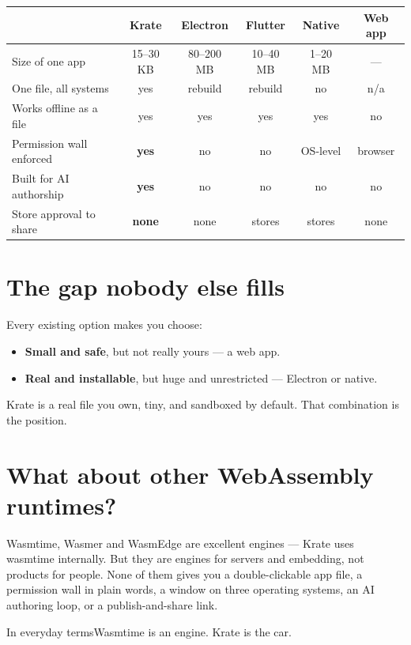 \documentclass[11pt,a4paper]{report}
\newcommand{\analogy}[1]{\begin{plainbox}{In everyday terms}#1\end{plainbox}}
\begin{document}
\begin{center}
\begin{tabular}{lccccc}
\toprule
& \textbf{Krate} & \textbf{Electron} & \textbf{Flutter} & \textbf{Native} & \textbf{Web app} \\
\midrule
Size of one app & 15--30 KB & 80--200 MB & 10--40 MB & 1--20 MB & --- \\
One file, all systems & yes & rebuild & rebuild & no & n/a \\
Works offline as a file & yes & yes & yes & yes & no \\
Permission wall enforced & \textbf{yes} & no & no & OS-level & browser \\
Built for AI authorship & \textbf{yes} & no & no & no & no \\
Store approval to share & \textbf{none} & none & stores & stores & none \\
\bottomrule
\end{tabular}
\end{center}

\section{The gap nobody else fills}

Every existing option makes you choose:

\begin{itemize}[leftmargin=*]
  \item \textbf{Small and safe}, but not really yours --- a web app.
  \item \textbf{Real and installable}, but huge and unrestricted ---
    Electron or native.
\end{itemize}

Krate is a real file you own, tiny, and sandboxed by default. That
combination is the position.

\section{What about other WebAssembly runtimes?}

Wasmtime, Wasmer and WasmEdge are excellent engines --- Krate uses
wasmtime internally. But they are engines for servers and embedding, not
products for people. None of them gives you a double-clickable app file, a
permission wall in plain words, a window on three operating systems, an AI
authoring loop, or a publish-and-share link.

\analogy{Wasmtime is an engine. Krate is the car.}
\end{document}
